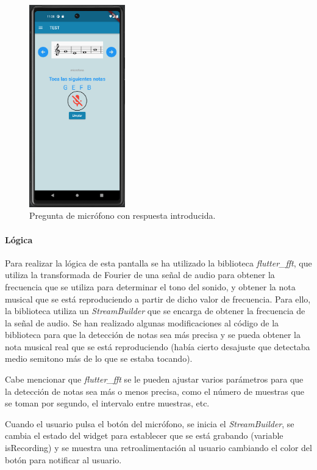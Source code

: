 \begin{figure}[H]
  \centering
  \includegraphics[width=0.37\textwidth]{imagenes/c7/entradamicrofono3.png}
  \caption{Pregunta de micrófono con respuesta introducida.}
  \label{fig:login}
\end{figure}

\paragraph*{Lógica}
Para realizar la lógica de esta pantalla se ha utilizado la biblioteca \textit{flutter\_fft}, que utiliza la transformada de Fourier de una señal de audio para obtener la frecuencia que se utiliza para determinar el tono del sonido,
 y obtener la nota musical que se está reproduciendo a partir de dicho valor de frecuencia.
Para ello, la biblioteca utiliza un \textit{StreamBuilder} que se encarga de obtener la frecuencia de la señal de audio. 
Se han realizado algunas modificaciones al código de la biblioteca para que la detección de notas sea más precisa y
 se pueda obtener la nota musical real que se está reproduciendo (había cierto desajuste que detectaba medio semitono más de lo que se estaba tocando).

Cabe mencionar que \textit{flutter\_fft} se le pueden ajustar varios parámetros para que la detección de notas sea más o menos precisa, 
como el número de muestras que se toman por segundo, el intervalo entre muestras, etc.

Cuando el usuario pulsa el botón del micrófono, se inicia el \textit{StreamBuilder}, se cambia el estado del widget para establecer 
que se está grabando (variable isRecording) y se muestra una retroalimentación al usuario cambiando el color del botón para notificar al usuario.

